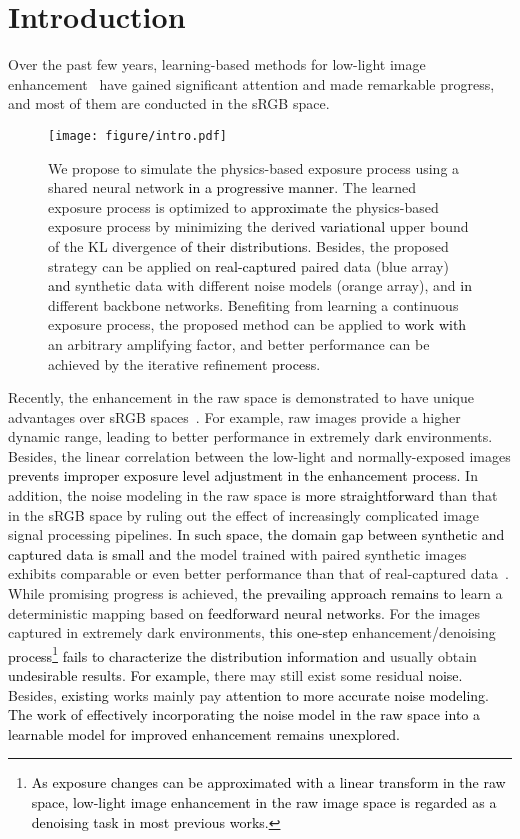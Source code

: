 \documentclass[10pt,twocolumn,letterpaper]{article}
\newcommand{\wh}[1]{\textcolor{black}{#1}}
\begin{document}
\vspace{-0.3cm}
\section{Introduction}
Over the past few years, learning-based methods for low-light image enhancement~\cite{liu2021benchmarking, li2021low, jin2023enhancing} have gained significant attention and made remarkable progress, and most of them are conducted in the sRGB space.
\begin{figure}[t]
    \centering
    \texttt{[image: figure/intro.pdf]} 
    \vspace{-0.65cm}
    \caption{
    We propose to simulate the physics-based exposure process using a shared neural network  \wh{in a progressive manner}.
The learned exposure process is optimized to \wh{approximate} the physics-based exposure process by minimizing the derived \wh{variational} upper bound of the KL divergence \wh{of their distributions}.
Besides, the proposed strategy can be applied on \wh{real-captured} paired data (blue array) \wh{and} synthetic data with different noise models (orange array), and \wh{in} different backbone networks. 
Benefiting from learning a continuous exposure process, the proposed method can be applied to \wh{work with} an arbitrary amplifying factor, and better performance can be achieved by the iterative refinement \wh{process}.}
\vspace{-0.5cm}
\end{figure}
Recently, the enhancement in the raw space is demonstrated to have unique advantages over sRGB spaces~\cite{huang2022towards}. For example, raw images provide a higher dynamic range, leading to better performance in extremely dark environments. Besides, the linear correlation between the low-light and normally-exposed images \wh{prevents improper exposure level adjustment in the enhancement process.}
In addition, the noise modeling in the raw space is \wh{more straightforward} than that in the sRGB space by ruling out the effect of increasingly complicated image signal processing pipelines. \wh{In such space, the domain gap between synthetic and captured data is small and} the model trained with paired synthetic images exhibits comparable or even better performance than that of real-captured data~\cite{wei2020physics, feng2022learnability}. 
While promising progress is achieved, \wh{the prevailing approach remains to} learn a deterministic mapping based on \wh{feedforward neural networks}. For the images captured in extremely dark environments, \wh{this one-step} enhancement/denoising \wh{process}\footnote{\wh{As exposure changes can be approximated with a linear transform in the raw space, low-light image enhancement in the raw image space is regarded as a denoising task in most previous works.}} \wh{fails to characterize the distribution information and}
usually obtain \wh{undesirable results}. \wh{For example,} there may still exist some residual \wh{noise.}
Besides, \wh{existing} works mainly pay \wh{attention to more accurate noise modeling}.
\wh{The work of effectively incorporating the noise model in the raw space into a learnable model for improved enhancement remains unexplored.}
\end{document}
